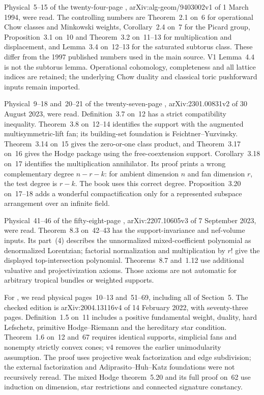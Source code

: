 Physical~5--15 of the twenty-four-page
\cite{FultonSturmfels94ToricIntersectionV1},
arXiv:alg-geom/9403002v1 of 1 March 1994, were read.
The controlling numbers are Theorem~2.1 on~6 for operational
Chow classes and Minkowski weights, Corollary~2.4 on~7 for
the Picard group, Proposition~3.1 on~10 and Theorem~3.2
on~11--13 for multiplication and displacement, and
Lemma~3.4 on~12--13 for the saturated subtorus class.
These differ from the 1997 published numbers used in the
main source. V1 Lemma~4.4 is not the subtorus lemma.
Operational cohomology, completeness and all lattice
indices are retained; the underlying Chow duality and
classical toric pushforward inputs remain imported.

Physical~9--18 and~20--21 of the twenty-seven-page
\cite{EurLarson23PolymatroidsV2}, arXiv:2301.00831v2
of 30 August 2023, were read. Definition~3.7 on~12
has a strict compatibility inequality. Theorem~3.8 on~12--14
identifies the support with the augmented multisymmetric-lift
fan; its building-set foundation is Feichtner--Yuzvinsky.
Theorem~3.14 on~15 gives the zero-or-one class product,
and Theorem~3.17 on~16 gives the Hodge package using the
free-coextension support. Corollary~3.18 on~17 identifies
the multiplication annihilator. Its proof prints a wrong
complementary degree $n-r-k$: for ambient dimension $n$
and fan dimension $r$, the test degree is $r-k$.
The book uses this correct degree. Proposition~3.20 on~17--18
adds a wonderful compactification only for a represented
subspace arrangement over an infinite field.

Physical~41--46 of the fifty-eight-page
\cite{EurHuhLarson23StellahedralV3}, arXiv:2207.10605v3
of 7 September 2023, were read. Theorem~8.3 on~42--43
has the support-invariance and nef-volume inputs. Its
part~(4) describes the unnormalized mixed-coefficient
polynomial as denormalized Lorentzian; factorial normalization
and multiplication by $r!$ give the displayed top-intersection
polynomial. Theorems~8.7 and~1.12 use additional valuative
and projectivization axioms. Those axioms are not automatic
for arbitrary tropical bundles or weighted supports.

For \cite{ArdilaDenhamHuh22LagrangianV4}, we read physical
pages~10--13 and~51--69, including all of Section~5.
The checked edition is arXiv:2004.13116v4 of
14 February 2022, with seventy-three pages.
Definition~1.5 on~11 includes a positive fundamental
weight, duality, hard Lefschetz, primitive Hodge--Riemann
and the hereditary star condition. Theorem~1.6 on~12 and~67
requires identical supports, simplicial fans and nonempty
strictly convex cones; v4 removes the earlier unimodularity
assumption. The proof uses projective weak factorization
and edge subdivision; the external factorization and
Adiprasito--Huh--Katz foundations were not recursively reread.
The mixed Hodge theorem~5.20 and its full proof on~62
use induction on dimension, star restrictions and connected
signature constancy.

